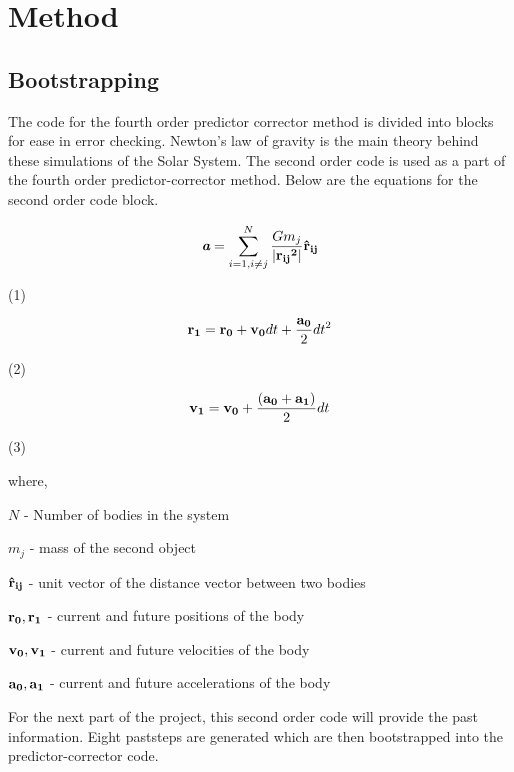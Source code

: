 \documentclass{article}
\begin{document}
\section{Method}
\subsection{Bootstrapping}
{\normalsize{
The code for the fourth order predictor corrector method is divided into blocks for ease in error checking. Newton's law of gravity is the main theory behind these simulations of the Solar System. The second order code is used as a part of the fourth order predictor-corrector method. Below are the equations for the second order code block.}}

\[  \textit{\textbf {a}} = \sum_{i=1, i \neq j}^{N}  \frac{Gm_j} {\left| \bf {r_{ij}}^2 \right|}  \bf{\hat {r}_{ij}} \]  \begin{flushright} (1)  \end{flushright}

\[ {\bf r_1} = {\bf r_0} + {\bf v_0} dt + \frac{{\bf a_0}} {2} dt^2 \]
\begin{flushright} (2)  \end{flushright}

\[ {\bf v_1} = {\bf v_0} + \frac{({\bf a_0}+{\bf a_1})} {2} dt \]
\begin{flushright} (3)  \end{flushright}

\smallskip

where, 

\smallskip

$N$ - Number of bodies in the system 

$m_j$ - mass of the second object

${\bf {\hat {r}_{ij}}}$  - unit vector of the distance vector between two bodies

${\bf r_0, r_1}$ - current and future positions of the body

${\bf v_0, v_1}$ - current and future velocities of the body

${\bf a_0, a_1}$ - current and future accelerations of the body

\bigskip                         
{\normalsize{
For the next part of the project, this second order code will provide the past information. Eight paststeps are generated which are then bootstrapped into the predictor-corrector code. }}

\bigskip
\end{document}

